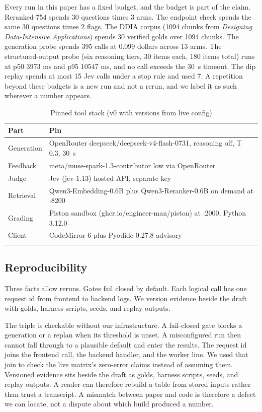 \documentclass[sn-mathphys,Numbered]{sn-jnl}%
\theoremstyle{thmstyleone}%
\theoremstyle{thmstyletwo}%
\theoremstyle{thmstylethree}%
\begin{document}
Every run in this paper has a fixed budget, and the budget is part of the claim. Reranked-754 spends 30 questions times 3 arms. The endpoint check spends the same 30 questions times 2 flags. The DDIA corpus (1094 chunks from \textit{Designing Data-Intensive Applications}) spends 30 verified golds over 1094 chunks. The generation probe spends 395 calls at 0.099 dollars across 13 arms. The structured-output probe (six reasoning tiers, 30 items each, 180 items total) runs at p50 3973 ms and p95 10547 ms, and no call exceeds the 30~s timeout. The dip replay spends at most 15 Jev calls under a stop rule and used 7. A repetition beyond these budgets is a new run and not a rerun, and we label it as such wherever a number appears.

\begin{table}[htbp]
\caption{Pinned tool stack (v0 with versions from live config)}\label{tab:tools}%
\begin{tabular*}{\textwidth}{@{\extracolsep\fill}ll@{}}
\toprule
Part & Pin \\
\midrule
Generation & OpenRouter deepseek/deepseek-v4-flash-0731, reasoning off, T 0.3, 30~s \\
Feedback & meta/muse-spark-1.3-contributor low via OpenRouter \\
Judge & Jev (jev-1.13) hosted API, separate key \\
Retrieval & Qwen3-Embedding-0.6B plus Qwen3-Reranker-0.6B on demand at :8200 \\
Grading & Piston sandbox (ghcr.io/engineer-man/piston) at :2000, Python 3.12.0 \\
Client & CodeMirror 6 plus Pyodide 0.27.8 advisory \\
\botrule
\end{tabular*}
\end{table}

\subsection{Reproducibility}\label{subsec38}

Three facts allow reruns. Gates fail closed by default. Each logical call has one request id from frontend to backend logs. We version evidence beside the draft with golds, harness scripts, seeds, and replay outputs.

The triple is checkable without our infrastructure. A fail-closed gate blocks a generation or a replan when its threshold is unset. A misconfigured run then cannot fall through to a plausible default and enter the results. The request id joins the frontend call, the backend handler, and the worker line. We used that join to check the live matrix's zero-error claims instead of assuming them. Versioned evidence sits beside the draft as golds, harness scripts, seeds, and replay outputs. A reader can therefore rebuild a table from stored inputs rather than trust a transcript. A mismatch between paper and code is therefore a defect we can locate, not a dispute about which build produced a number.
\end{document}
